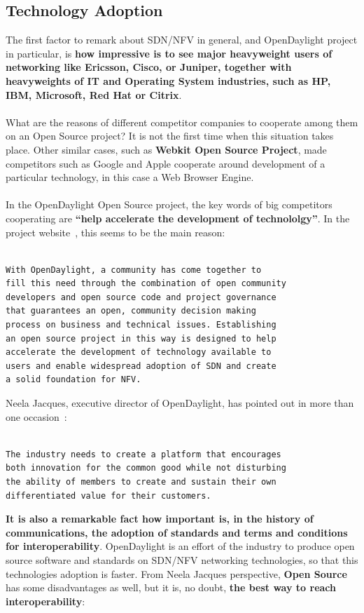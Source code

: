 \documentclass[a4paper, 12pt]{book}
\begin{document}
\subsection{Technology Adoption}
The first factor to remark about SDN/NFV in general, and OpenDaylight project in particular, is \textbf{how impressive is to see major heavyweight users of networking like Ericsson, Cisco, or Juniper, together with heavyweights of IT and Operating System industries, such as HP, IBM, Microsoft, Red Hat or Citrix}.\\
\\
What are the reasons of different competitor companies to cooperate among them on an Open Source project? It is not the first time when this situation takes place. Other similar cases, such as \textbf{Webkit Open Source Project}, made competitors such as Google and Apple cooperate around development of a particular technology, in this case a Web Browser Engine.\\
\\
In the OpenDaylight Open Source project, the key words of big competitors cooperating are \textbf{``help accelerate the development of technololgy''}. In the project website~\cite{OpenDaylightAbout}, this seems to be the main reason:
\begin{verbatim}

With OpenDaylight, a community has come together to
fill this need through the combination of open community
developers and open source code and project governance
that guarantees an open, community decision making
process on business and technical issues. Establishing
an open source project in this way is designed to help
accelerate the development of technology available to
users and enable widespread adoption of SDN and create
a solid foundation for NFV.

\end{verbatim}
Neela Jacques, executive director of OpenDaylight, has pointed out in more than one occasion~\cite{NFVZoneOpenDaylight}:
\begin{verbatim}

The industry needs to create a platform that encourages
both innovation for the common good while not disturbing
the ability of members to create and sustain their own
differentiated value for their customers.

\end{verbatim}
\textbf{It is also a remarkable fact how important is, in the history of communications, the adoption of standards and terms and conditions for interoperability}. OpenDaylight is an effort of the industry to produce open source software and standards on SDN/NFV networking technologies, so that this technologies adoption is faster. From Neela Jacques perspective, \textbf{Open Source} has some disadvantages as well, but it is, no doubt, \textbf{the best way to reach interoperability}:
\end{document}

